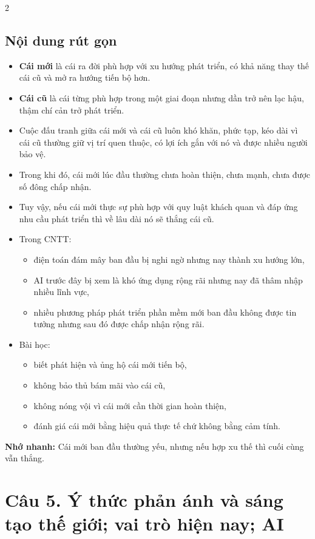 \documentclass[9pt,a4paper]{extarticle}
\begin{document}
\begin{multicols*}{2}
\subsection*{Nội dung rút gọn}
\begin{itemize}
  \item \textbf{Cái mới} là cái ra đời phù hợp với xu hướng phát triển, có khả năng thay thế cái cũ và mở ra hướng tiến bộ hơn.
  \item \textbf{Cái cũ} là cái từng phù hợp trong một giai đoạn nhưng dần trở nên lạc hậu, thậm chí cản trở phát triển.
  \item Cuộc đấu tranh giữa cái mới và cái cũ luôn khó khăn, phức tạp, kéo dài vì cái cũ thường giữ vị trí quen thuộc, có lợi ích gắn với nó và được nhiều người bảo vệ.
  \item Trong khi đó, cái mới lúc đầu thường chưa hoàn thiện, chưa mạnh, chưa được số đông chấp nhận.
  \item Tuy vậy, nếu cái mới thực sự phù hợp với quy luật khách quan và đáp ứng nhu cầu phát triển thì về lâu dài nó sẽ thắng cái cũ.
  \item Trong CNTT:
  \begin{itemize}
    \item điện toán đám mây ban đầu bị nghi ngờ nhưng nay thành xu hướng lớn,
    \item AI trước đây bị xem là khó ứng dụng rộng rãi nhưng nay đã thâm nhập nhiều lĩnh vực,
    \item nhiều phương pháp phát triển phần mềm mới ban đầu không được tin tưởng nhưng sau đó được chấp nhận rộng rãi.
  \end{itemize}
  \item Bài học:
  \begin{itemize}
    \item biết phát hiện và ủng hộ cái mới tiến bộ,
    \item không bảo thủ bám mãi vào cái cũ,
    \item không nóng vội vì cái mới cần thời gian hoàn thiện,
    \item đánh giá cái mới bằng hiệu quả thực tế chứ không bằng cảm tính.
  \end{itemize}
\end{itemize}

\textbf{Nhớ nhanh:} Cái mới ban đầu thường yếu, nhưng nếu hợp xu thế thì cuối cùng vẫn thắng.

\section*{Câu 5. Ý thức phản ánh và sáng tạo thế giới; vai trò hiện nay; AI}

\end{multicols*}
\end{document}
